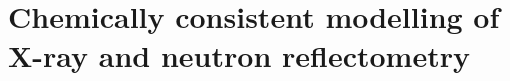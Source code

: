 
\chapter{Chemically consistent modelling of X-ray and neutron reflectometry} %

\label{reflectometry1} %




\pagebreak





